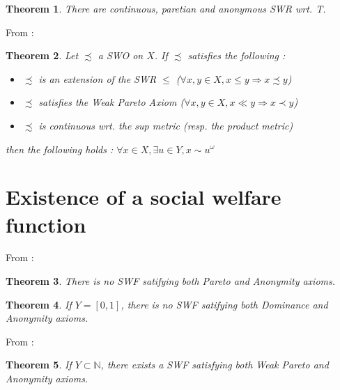 \documentclass{article}
\newtheorem{theorem}{Theorem}
\begin{document}
\begin{theorem}
  There are continuous, paretian and anonymous SWR wrt. T.
\end{theorem}

  From \cite{diamond65}:

\begin{theorem}
  Let \(\precsim\) a SWO on \(X\). If \(\precsim\) satisfies the
  following :
  \begin{itemize}
  \item \(\precsim\) is an extension of the SWR \(\leq\)
    (\(\forall x, y \in X, x \leq y \Rightarrow x \precsim y\))
  \item \(\precsim\) satisfies the Weak Pareto Axiom
    (\(\forall x, y \in X, x \ll y \Rightarrow x \prec y\))
  \item \(\precsim\) is continuous wrt. the sup metric (resp. the
    product metric)
  \end{itemize}
  then the following holds :
  \(\forall x \in X, \exists u \in Y, x \sim u^\omega\)
\end{theorem}

\section{Existence of a social welfare function}

From \cite{basumitra03}:

\begin{theorem}
  There is no SWF satifying both Pareto and Anonymity axioms.
\end{theorem}

\begin{theorem}
  If $Y=[0,1]$, there is no SWF satifying both Dominance and Anonymity axioms.
\end{theorem}

From \cite{basumitra07p}:

\begin{theorem}
  If $Y\subset\mathbb N$, there exists a SWF satisfying both Weak Pareto and Anonymity axioms.
\end{theorem}



\end{document}
